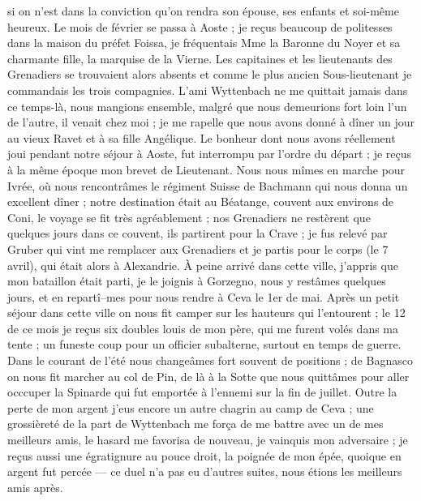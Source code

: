 \documentclass[12pt]{article}
\begin{document}
 si on n’est dans la conviction qu’on rendra son épouse,
ses enfants et soi-même heureux. Le mois de février se passa à Aoste ; je reçus beaucoup de
politesses dans la maison du préfet Foissa, je fréquentais Mme la Baronne du Noyer et sa charmante
fille, la marquise de la Vierne. Les capitaines et les lieutenants des Grenadiers se trouvaient
alors absents et comme le plus ancien Sous-lieutenant je commandais les trois compagnies. L’ami
Wyttenbach ne me quittait jamais dans ce temps-là, nous mangions ensemble, malgré que nous
demeurions fort loin l’un de l’autre, il venait chez moi ; je me rapelle que nous avons donné à
dîner un jour au vieux Ravet et à sa fille Angélique. Le bonheur dont nous avons réellement joui
pendant notre séjour à Aoste, fut interrompu par l’ordre du départ ; je reçus à la même époque mon
brevet de Lieutenant. Nous nous mîmes en marche pour Ivrée, où nous rencontrâmes le régiment Suisse
de Bachmann qui nous donna un excellent dîner ; notre destination était au Béatange, couvent aux
environs de Coni, le voyage se fit très agréablement ; nos Grenadiers ne restèrent que quelques
jours dans ce couvent, ils partirent pour la Crave ; je fus relevé par Gruber qui vint me remplacer
aux Grenadiers et je partis pour le corps (le 7 avril), qui était alors à Alexandrie. À peine arrivé
dans cette ville, j’appris que mon bataillon était parti, je le joignis à Gorzegno, nous y restâmes
quelques jours, et en repartî–mes pour nous rendre à Ceva le 1er de mai. Après un petit séjour dans
cette ville on nous fit camper sur les hauteurs qui l’entourent ; le 12 de ce mois je reçus six
doubles louis de mon père, qui me furent volés dans ma tente ; un funeste coup pour un officier
subalterne, surtout en temps de guerre. Dans le courant de l’été nous changeâmes fort souvent de
positions ; de Bagnasco on nous fit marcher au col de Pin, de là à la Sotte que nous quittâmes pour
aller occcuper la Spinarde qui fut emportée à l’ennemi sur la fin de juillet. Outre la perte de mon
argent j’eus encore un autre chagrin au camp de Ceva ; une grossièreté de la part de Wyttenbach me
força de me battre avec un de mes meilleurs amis, le hasard me favorisa de nouveau, je vainquis mon
adversaire ; je reçus aussi une égratignure au pouce droit, la poignée de mon épée, quoique en
argent fut percée — ce duel n’a pas eu d’autres suites, nous étions les meilleurs amis après.
\end{document}
